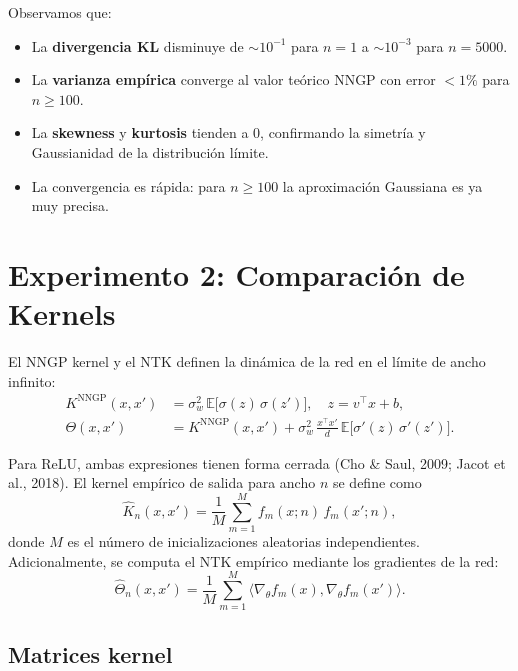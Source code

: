 \documentclass[11pt,a4paper]{article}
\begin{document}
Observamos que:
\begin{itemize}
  \item La \textbf{divergencia KL} disminuye de $\sim 10^{-1}$ para $n=1$ a $\sim 10^{-3}$ para $n=5000$.
  \item La \textbf{varianza empírica} converge al valor teórico NNGP con error $<1\%$ para $n \geq 100$.
  \item La \textbf{skewness} y \textbf{kurtosis} tienden a 0, confirmando la simetría y Gaussianidad de la distribución límite.
  \item La convergencia es rápida: para $n \geq 100$ la aproximación Gaussiana es ya muy precisa.
\end{itemize}

\section{Experimento 2: Comparación de Kernels}

El NNGP kernel y el NTK definen la dinámica de la red en el límite de ancho infinito:
\begin{align}
K^{\text{NNGP}}(x,x') &= \sigma_w^2\,\mathbb{E}\bigl[\sigma(z)\,\sigma(z')\bigr], \quad
z = v^\top x + b, \\
\Theta(x,x') &= K^{\text{NNGP}}(x,x') + \sigma_w^2\,\frac{x^\top x'}{d}\,\mathbb{E}\bigl[\sigma'(z)\,\sigma'(z')\bigr].
\end{align}

Para ReLU, ambas expresiones tienen forma cerrada (Cho \& Saul, 2009; Jacot et al., 2018). El kernel empírico de salida para ancho $n$ se define como
\begin{equation}
\hat{K}_n(x,x') = \frac{1}{M}\sum_{m=1}^{M} f_m(x; n)\, f_m(x'; n),
\end{equation}
donde $M$ es el número de inicializaciones aleatorias independientes. Adicionalmente, se computa el NTK empírico mediante los gradientes de la red:
\begin{equation}
\hat{\Theta}_n(x,x') = \frac{1}{M}\sum_{m=1}^{M} \langle \nabla_\theta f_m(x), \nabla_\theta f_m(x') \rangle.
\end{equation}

\subsection{Matrices kernel}
\end{document}
